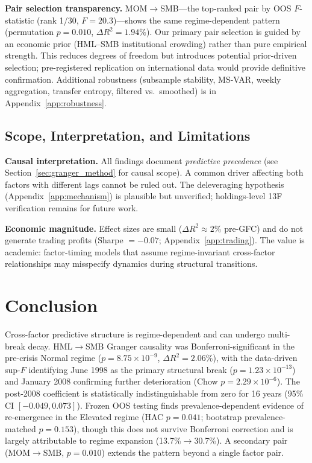 \documentclass[sigconf,anonymous]{acmart}
\begin{document}
\textbf{Pair selection transparency.}
MOM$\to$SMB---the top-ranked pair by OOS $F$-statistic (rank 1/30,
$F = 20.3$)---shows the same regime-dependent pattern (permutation
$p = 0.010$, $\Delta R^2 = 1.94\%$). Our primary pair selection is guided
by an economic prior (HML--SMB institutional crowding) rather than pure
empirical strength. This reduces degrees of freedom but introduces potential
prior-driven selection; pre-registered replication on international data would
provide definitive confirmation.
Additional robustness (subsample stability, MS-VAR, weekly aggregation,
transfer entropy, filtered vs.\ smoothed) is in Appendix~\ref{app:robustness}.

\subsection{Scope, Interpretation, and Limitations}
\label{sec:limitations}

\textbf{Causal interpretation.}
All findings document \emph{predictive precedence} (see Section~\ref{sec:granger_method} for causal scope).
A common driver affecting both factors with different lags cannot be ruled out.
The deleveraging hypothesis (Appendix~\ref{app:mechanism}) is plausible but
unverified; holdings-level 13F verification remains for future work.

\textbf{Economic magnitude.}
Effect sizes are small ($\Delta R^2 \approx 2\%$ pre-GFC) and do not generate
trading profits (Sharpe $= -0.07$; Appendix~\ref{app:trading}). The value is
academic: factor-timing models that assume regime-invariant cross-factor
relationships may misspecify dynamics during structural transitions.

\section{Conclusion}

Cross-factor predictive structure is regime-dependent and can undergo
multi-break decay. HML$\to$SMB Granger causality was Bonferroni-significant
in the pre-crisis Normal regime ($p = 8.75 \times 10^{-9}$, $\Delta R^2 = 2.06\%$),
with the data-driven sup-$F$ identifying June 1998 as the primary structural break
($p = 1.23 \times 10^{-13}$) and January 2008 confirming further deterioration
(Chow $p = 2.29 \times 10^{-6}$). The post-2008 coefficient is statistically
indistinguishable from zero for 16 years (95\% CI $[-0.049, 0.073]$).
Frozen OOS testing finds prevalence-dependent evidence
of re-emergence in the Elevated regime (HAC $p = 0.041$; bootstrap prevalence-matched
$p = 0.153$), though this does not survive Bonferroni correction
and is largely attributable to regime expansion (13.7\%$\to$30.7\%). A secondary pair
(MOM$\to$SMB, $p = 0.010$) extends the pattern beyond a single factor pair.
\end{document}
